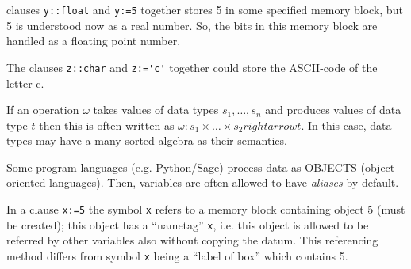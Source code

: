 \begin{example}
clauses \verb|y::float| and \verb|y:=5| together stores 5 in some specified memory block, but 5 is understood now as a real number. So, the bits in this memory block are handled as a floating point number.
\end{example}

\begin{example}
The clauses \verb|z::char| and \verb|z:='c'| together could store the ASCII-code of the letter c.
\end{example}

\begin{example}
If an operation $\omega$ takes values of data types $s_1, \ldots ,s_n$ and produces values of data type $t$ then this is often written as $\omega : s_1 \times\ldots\times s_2 rightarrow t$. In this case, data types may have a many-sorted algebra as their semantics.
\end{example}

\note Some program languages (e.g. Python/Sage) process data as OBJECTS (object-oriented languages). Then, variables are often allowed to have \emph{aliases} by default.

\begin{example}
In a clause \verb|x:=5| the symbol \verb|x| refers to a memory block containing object 5 (must be created); this object has a ``nametag'' \verb|x|, i.e. this object is allowed to be referred by other variables also without copying the datum. This referencing method differs from symbol \verb|x| being a ``label of box'' which contains 5.
\end{example}


